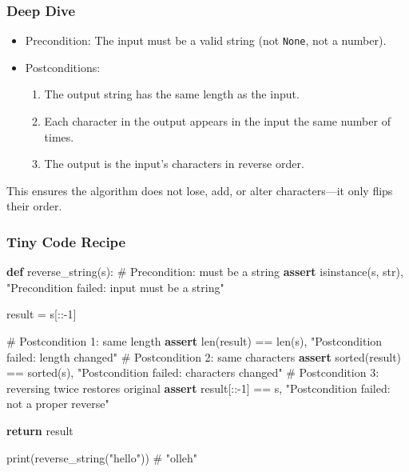 \documentclass[
  letterpaper,
  DIV=11,
  numbers=noendperiod]{scrreprt}
\newenvironment{Shaded}{\begin{snugshade}}{\end{snugshade}}
\newcommand{\BuiltInTok}[1]{\textcolor[rgb]{0.00,0.23,0.31}{#1}}
\newcommand{\CommentTok}[1]{\textcolor[rgb]{0.37,0.37,0.37}{#1}}
\newcommand{\ControlFlowTok}[1]{\textcolor[rgb]{0.00,0.23,0.31}{\textbf{#1}}}
\newcommand{\DecValTok}[1]{\textcolor[rgb]{0.68,0.00,0.00}{#1}}
\newcommand{\KeywordTok}[1]{\textcolor[rgb]{0.00,0.23,0.31}{\textbf{#1}}}
\newcommand{\NormalTok}[1]{\textcolor[rgb]{0.00,0.23,0.31}{#1}}
\newcommand{\OperatorTok}[1]{\textcolor[rgb]{0.37,0.37,0.37}{#1}}
\newcommand{\StringTok}[1]{\textcolor[rgb]{0.13,0.47,0.30}{#1}}
\providecommand{\tightlist}{%
  \setlength{\itemsep}{0pt}\setlength{\parskip}{0pt}}
\begin{document}
\subsubsection{Deep Dive}\label{deep-dive-39}

\begin{itemize}
\item
  Precondition: The input must be a valid string (not \texttt{None}, not
  a number).
\item
  Postconditions:

  \begin{enumerate}
  \def\labelenumi{\arabic{enumi}.}
  \tightlist
  \item
    The output string has the same length as the input.
  \item
    Each character in the output appears in the input the same number of
    times.
  \item
    The output is the input's characters in reverse order.
  \end{enumerate}
\end{itemize}

This ensures the algorithm does not lose, add, or alter characters---it
only flips their order.

\subsubsection{Tiny Code Recipe}\label{tiny-code-recipe-67}

\begin{Shaded}
\begin{Highlighting}[]
\KeywordTok{def}\NormalTok{ reverse\_string(s):}
    \CommentTok{\# Precondition: must be a string}
    \ControlFlowTok{assert} \BuiltInTok{isinstance}\NormalTok{(s, }\BuiltInTok{str}\NormalTok{), }\StringTok{"Precondition failed: input must be a string"}
    
\NormalTok{    result }\OperatorTok{=}\NormalTok{ s[::}\OperatorTok{{-}}\DecValTok{1}\NormalTok{]}
    
    \CommentTok{\# Postcondition 1: same length}
    \ControlFlowTok{assert} \BuiltInTok{len}\NormalTok{(result) }\OperatorTok{==} \BuiltInTok{len}\NormalTok{(s), }\StringTok{"Postcondition failed: length changed"}
    \CommentTok{\# Postcondition 2: same characters}
    \ControlFlowTok{assert} \BuiltInTok{sorted}\NormalTok{(result) }\OperatorTok{==} \BuiltInTok{sorted}\NormalTok{(s), }\StringTok{"Postcondition failed: characters changed"}
    \CommentTok{\# Postcondition 3: reversing twice restores original}
    \ControlFlowTok{assert}\NormalTok{ result[::}\OperatorTok{{-}}\DecValTok{1}\NormalTok{] }\OperatorTok{==}\NormalTok{ s, }\StringTok{"Postcondition failed: not a proper reverse"}
    
    \ControlFlowTok{return}\NormalTok{ result}

\BuiltInTok{print}\NormalTok{(reverse\_string(}\StringTok{"hello"}\NormalTok{))  }\CommentTok{\# "olleh"}
\end{Highlighting}
\end{Shaded}
\end{document}

